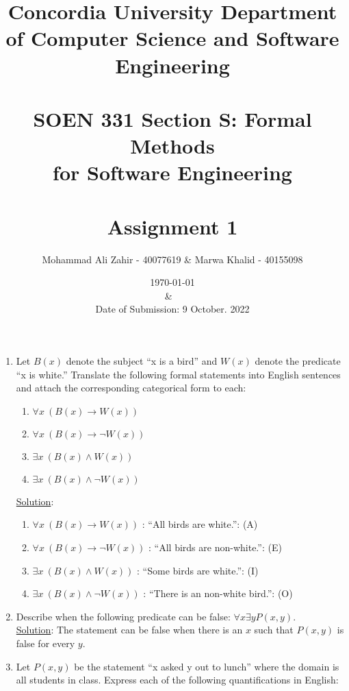 \documentclass[12pt]{article}
\title{\textbf{Concordia University
Department of Computer Science and Software
Engineering} \\ \ \\SOEN 331 Section S: Formal Methods\\for Software Engineering\\
 \\ 
Assignment 1}}
\author{Mohammad Ali Zahir - 40077619 & Marwa Khalid - 40155098}
\date{\today \\ & \ \\ Date of Submission: 9 October. 2022}
\begin{document}
\maketitle



\newpage
\begin{enumerate}

\item Let $B(x)$ denote the subject ``x is a bird'' and $W(x)$ denote the predicate ``x is white.'' Translate the following formal statements into English sentences and attach the corresponding categorical form to each:

\begin{enumerate}
\item $\forall x~(B(x) \rightarrow W(x))$


\item $\forall x~(B(x) \rightarrow \neg W(x))$ 


\item $\exists x~(B(x) \wedge W(x))$ 


\item $\exists x~(B(x) \wedge \neg W(x))$ 
\end{enumerate}

\noindent \underline{Solution}: \\

\begin{enumerate}
\item $\forall x~(B(x) \rightarrow W(x))$ : ``All birds are white.'': (A)
\item $\forall x~(B(x) \rightarrow \neg W(x))$ : ``All birds are non-white.'': (E)
\item $\exists x~(B(x) \wedge W(x))$ : ``Some birds are white.'': (I)
\item $\exists x~(B(x) \wedge \neg W(x))$ : ``There is an non-white bird.'': (O)
\end{enumerate}


\item Describe when the following predicate can be false: $\forall x \exists y P(x, y)$.\\

\noindent \underline{Solution}: The statement can be false when there is an $x$ such that $P(x, y)$ is false for every $y$.



\item Let $P(x, y)$ be the statement ``x asked y out to lunch'' where the domain is all students in class. Express each of the following quantifications in English:


\end{enumerate}
\end{document}
